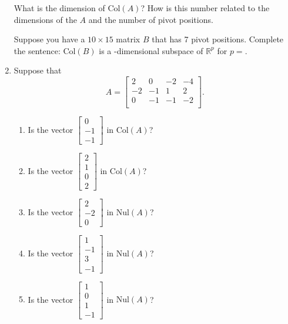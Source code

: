 \documentclass[12pt]{article}
\newcommand{\vs}[1]{\vspace{#1in}}
\newcommand{\real}{{\mathbb R}}
\newcommand{\threevec}[3]{\left[\begin{array}{r}#1 \\ #2 \\ #3
  \end{array}\right]}
\newcommand{\fourvec}[4]{\left[\begin{array}{r}#1 \\ #2 \\ #3 \\ #4
    \end{array}\right]}
\newcommand{\col}{\text{Col}}
\newcommand{\nul}{\text{Nul}}
\begin{document}
\begin{enumerate}
  \vs{1}
  What is the dimension of $\col(A)$?  How is this number related to
  the dimensions of the $A$ and the number of pivot positions.

  \vs{1}
  Suppose you have a $10\times 15$ matrix $B$ that has 7 pivot
  positions.  Complete the sentence:
  $\col(B)$ is a \underline{\hspace*{1in}}-dimensional subspace of
  $\real^p$ for $p = $\underline{\hspace*{1in}}.
  
  \vs{0.25}
\item Suppose that
  $$
  A =
  \left[
    \begin{array}{cccc}
      2 & 0 & -2 & -4 \\
      -2 & -1 & 1 & 2 \\
      0 & -1 & -1 & -2 \\
    \end{array}
  \right].
  $$

  \begin{enumerate}[label=(\alph*)]
  \item Is the vector $\threevec0{-1}{-1}$ in $\col(A)$?

    \vs{1}
  \item Is the vector $\fourvec2102$ in $\col(A)$?

    \vs{1}
  \item Is the vector $\threevec{2}{-2}{0}$ in $\nul(A)$?

    \vs{1}
  \item Is the vector $\fourvec1{-1}3{-1}$ in $\nul(A)$?

    \vs{1}
  \item Is the vector $\fourvec101{-1}$ in $\nul(A)$?

    \vs{1}
  \end{enumerate}
  
  
\end{enumerate}
\end{document}
